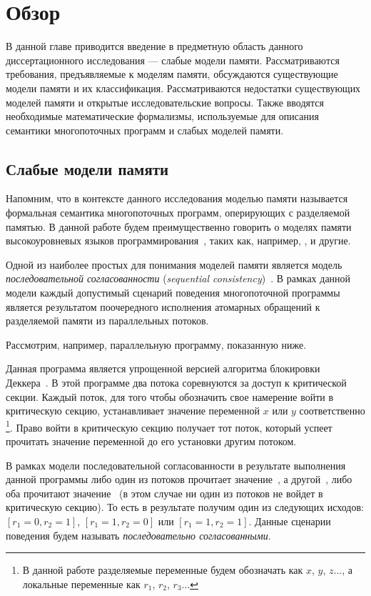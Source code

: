 \chapter{Обзор}
\label{ch:review}

В данной главе приводится введение в предметную область
данного диссертационного исследования --- слабые модели памяти.
Рассматриваются требования, предъявляемые к моделям памяти,
обсуждаются существующие модели памяти и их классификация.
Рассматриваются недостатки существующих моделей памяти
и открытые исследовательские вопросы.
Также вводятся необходимые математические формализмы,
используемые для описания семантики многопоточных программ
и слабых моделей памяти. 

\section{Слабые модели памяти}
\label{sec:models-intro}

Напомним, что в контексте данного исследования
моделью памяти называется формальная семантика
многопоточных программ, оперирующих с разделяемой памятью.
В данной работе будем преимущественно говорить о моделях памяти 
высокоуровневых языков программирования~\cite{Moiseenko-al:PCS21}, 
таких как, например, \CPP, \Java и другие. 

Одной из наиболее простых для понимания моделей памяти
является модель \emph{последовательной согласованности}
(\emph{sequential consistency})~\cite{Lamport:TC79}.
В рамках данной модели каждый допустимый
сценарий поведения многопоточной программы
является результатом поочередного исполнения
атомарных обращений к разделяемой памяти из параллельных потоков.

Рассмотрим, например, параллельную программу, показанную ниже.



Данная программа является упрощенной версией
алгоритма блокировки Деккера~\cite{Dijkstra:68}.
В этой программе два потока соревнуются за доступ к критической секции.
Каждый поток, для того чтобы обозначить свое намерение войти в критическую секцию,
устанавливает значение переменной $x$ или $y$ соответственно
\footnote{В данной работе разделяемые переменные
будем обозначать как $x$, $y$, $z$..., 
а локальные переменные как $r_1$, $r_2$, $r_3$...}.
Право войти в критическую секцию получает тот поток, 
который успеет прочитать значение переменной до его установки другим потоком.

В рамках модели последовательной согласованности
в результате выполнения данной программы 
либо один из потоков прочитает значение~, а другой~, 
либо оба прочитают значение~ (в этом случае ни один из потоков
не войдет в критическую секцию).
То есть в результате получим один из следующих исходов:
${[r_1=0, r_2=1]}$, ${[r_1=1,r_2=0]}$ или ${[r_1=1,r_2=1]}$. 
Данные сценарии поведения будем называть 
\emph{последовательно согласованными}.


